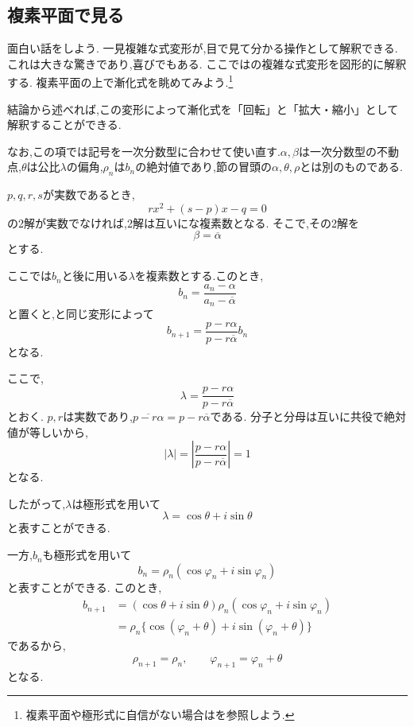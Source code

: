 
\subsection{複素平面で見る}\label{節：複素平面で見る}
  面白い話をしよう.
  一見複雑な式変形が,目で見て分かる操作として解釈できる.これは大きな驚きであり,喜びでもある.
  ここではの複雑な式変形を図形的に解釈する.
  複素平面の上で漸化式を眺めてみよう.\footnote{複素平面や極形式に自信がない場合はを参照しよう.}

  結論から述べれば,この変形によって漸化式を「回転」と「拡大・縮小」として解釈することができる.
 
  なお,この項では記号を一次分数型に合わせて使い直す.$\alpha,\beta$は一次分数型の不動点,$\theta$は公比$\lambda$の偏角,$\rho_n$は$b_n$の絶対値であり,節の冒頭の$\alpha,\theta,\rho$とは別のものである.

  $p,q,r,s$が実数であるとき,
  \[
    rx^2+(s-p)x-q=0
  \]
  の2解が実数でなければ,2解は互いにな複素数となる.
  そこで,その2解を
  \[
    \beta=\overline{\alpha}
  \]
  とする.
  
  ここでは$b_n$と後に用いる$\lambda$を複素数とする.このとき,
  \[
    b_n=\frac{a_n-\alpha}{a_n-\overline{\alpha}}
  \]
  と置くと,と同じ変形によって
  \[
    b_{n+1}
    =
    \frac{p-r\alpha}{p-r\overline{\alpha}}b_n
  \]
  となる.
  
  ここで,
  \[
    \lambda=\frac{p-r\alpha}{p-r\overline{\alpha}}
  \]
  とおく.
  $p,r$は実数であり,$\overline{p-r\alpha}=p-r\overline{\alpha}$である.
  分子と分母は互いに共役で絶対値が等しいから,
  \[
    |\lambda|
    =
    \left|
    \frac{p-r\alpha}{p-r\overline{\alpha}}
    \right|
    =1
  \]
  となる.
  
  したがって,$\lambda$は極形式を用いて
  \[
    \lambda=\cos\theta+i\sin\theta
  \]
  と表すことができる.
  
  一方,$b_n$も極形式を用いて
  \[
    b_n=\rho_n(\cos\varphi_n+i\sin\varphi_n)
  \]
  と表すことができる.
  このとき,
  \begin{align*}
    b_{n+1}
    &=
    (\cos\theta+i\sin\theta)
    \rho_n(\cos\varphi_n+i\sin\varphi_n)\\
    &=
    \rho_n
    \{\cos(\varphi_n+\theta)
    +i\sin(\varphi_n+\theta)\}
  \end{align*}
  であるから,
  \[
    \rho_{n+1}=\rho_n,
    \qquad
    \varphi_{n+1}=\varphi_n+\theta
  \]
  となる.
  
